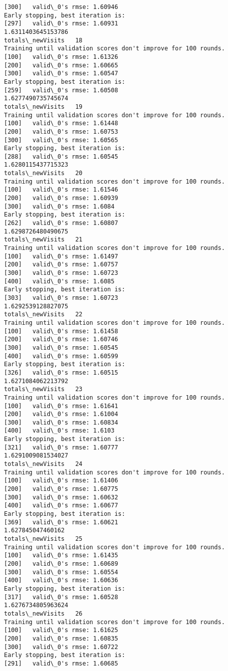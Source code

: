 \documentclass[11pt]{article}
\begin{document}
\begin{Verbatim}[commandchars=\\\{\}]
[300]	valid\_0's rmse: 1.60946
Early stopping, best iteration is:
[297]	valid\_0's rmse: 1.60931
1.6311403645153786
totals\_newVisits   18
Training until validation scores don't improve for 100 rounds.
[100]	valid\_0's rmse: 1.61326
[200]	valid\_0's rmse: 1.60665
[300]	valid\_0's rmse: 1.60547
Early stopping, best iteration is:
[259]	valid\_0's rmse: 1.60508
1.6277490735745674
totals\_newVisits   19
Training until validation scores don't improve for 100 rounds.
[100]	valid\_0's rmse: 1.61448
[200]	valid\_0's rmse: 1.60753
[300]	valid\_0's rmse: 1.60565
Early stopping, best iteration is:
[288]	valid\_0's rmse: 1.60545
1.6280115437715323
totals\_newVisits   20
Training until validation scores don't improve for 100 rounds.
[100]	valid\_0's rmse: 1.61546
[200]	valid\_0's rmse: 1.60939
[300]	valid\_0's rmse: 1.6084
Early stopping, best iteration is:
[262]	valid\_0's rmse: 1.60807
1.6298726480490675
totals\_newVisits   21
Training until validation scores don't improve for 100 rounds.
[100]	valid\_0's rmse: 1.61497
[200]	valid\_0's rmse: 1.60757
[300]	valid\_0's rmse: 1.60723
[400]	valid\_0's rmse: 1.6085
Early stopping, best iteration is:
[303]	valid\_0's rmse: 1.60723
1.6292539128827075
totals\_newVisits   22
Training until validation scores don't improve for 100 rounds.
[100]	valid\_0's rmse: 1.61458
[200]	valid\_0's rmse: 1.60746
[300]	valid\_0's rmse: 1.60545
[400]	valid\_0's rmse: 1.60599
Early stopping, best iteration is:
[326]	valid\_0's rmse: 1.60515
1.6271084062213792
totals\_newVisits   23
Training until validation scores don't improve for 100 rounds.
[100]	valid\_0's rmse: 1.61641
[200]	valid\_0's rmse: 1.61004
[300]	valid\_0's rmse: 1.60834
[400]	valid\_0's rmse: 1.6103
Early stopping, best iteration is:
[321]	valid\_0's rmse: 1.60777
1.6291009081534027
totals\_newVisits   24
Training until validation scores don't improve for 100 rounds.
[100]	valid\_0's rmse: 1.61406
[200]	valid\_0's rmse: 1.60775
[300]	valid\_0's rmse: 1.60632
[400]	valid\_0's rmse: 1.60677
Early stopping, best iteration is:
[369]	valid\_0's rmse: 1.60621
1.627845047460162
totals\_newVisits   25
Training until validation scores don't improve for 100 rounds.
[100]	valid\_0's rmse: 1.61435
[200]	valid\_0's rmse: 1.60689
[300]	valid\_0's rmse: 1.60554
[400]	valid\_0's rmse: 1.60636
Early stopping, best iteration is:
[317]	valid\_0's rmse: 1.60528
1.6276734805963624
totals\_newVisits   26
Training until validation scores don't improve for 100 rounds.
[100]	valid\_0's rmse: 1.61625
[200]	valid\_0's rmse: 1.60835
[300]	valid\_0's rmse: 1.60722
Early stopping, best iteration is:
[291]	valid\_0's rmse: 1.60685

\end{Verbatim}
\end{document}
